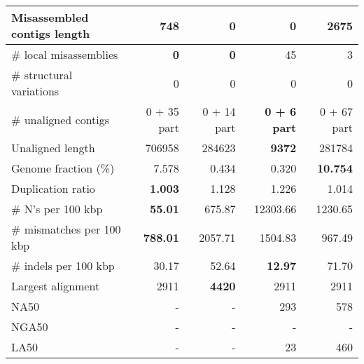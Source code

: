 \documentclass[12pt,a4paper]{article}
\begin{document}
\begin{table}[ht]
\begin{center}
\begin{tabular}{|l*{4}{|r}|}
Misassembled contigs length & 748 & {\bf 0} & {\bf 0} & 2675 \\ \hline
\# local misassemblies & {\bf 0} & {\bf 0} & 45 & 3 \\ \hline
\# structural variations & 0 & 0 & 0 & 0 \\ \hline
\# unaligned contigs & 0 + 35 part & 0 + 14 part & {\bf 0 + 6 part} & 0 + 67 part \\ \hline
Unaligned length & 706958 & 284623 & {\bf 9372} & 281784 \\ \hline
Genome fraction (\%) & 7.578 & 0.434 & 0.320 & {\bf 10.754} \\ \hline
Duplication ratio & {\bf 1.003} & 1.128 & 1.226 & 1.014 \\ \hline
\# N's per 100 kbp & {\bf 55.01} & 675.87 & 12303.66 & 1230.65 \\ \hline
\# mismatches per 100 kbp & {\bf 788.01} & 2057.71 & 1504.83 & 967.49 \\ \hline
\# indels per 100 kbp & 30.17 & 52.64 & {\bf 12.97} & 71.70 \\ \hline
Largest alignment & 2911 & {\bf 4420} & 2911 & 2911 \\ \hline
NA50 & - & - & 293 & 578 \\ \hline
NGA50 & - & - & - & - \\ \hline
LA50 & - & - & 23 & 460 \\ \hline
\end{tabular}
\end{center}
\end{table}
\end{document}
